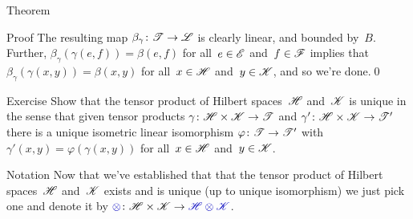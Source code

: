 \documentclass[a]{subfiles}
\begin{document}
\begin{parsec}
\begin{point}{Theorem}
\begin{point}{Proof}
The resulting map $\beta_\gamma\colon \mathscr{T}\to\mathscr{L}$
is clearly linear,
and
bounded by~$B$.
Further,
$\beta_\gamma(\gamma(e,f))=\beta(e,f)$
for all~$e\in\mathscr{E}$ and~$f\in\mathscr{F}$
implies
that $\beta_\gamma(\gamma(x,y))=\beta(x,y)$
for all~$x\in \mathscr{H}$ and~$y\in\mathscr{K}$,
and so we're done.\qed
\end{point}
\end{point}
\begin{point}{Exercise}%
Show that the tensor product of Hilbert spaces~$\mathscr{H}$
and~$\mathscr{K}$ is unique in the sense
that given tensor products $\gamma\colon \mathscr{H}\times\mathscr{K}\to\mathscr{T}$
and $\gamma'\colon\mathscr{H}\times\mathscr{K}\to\mathscr{T}'$
there is a unique isometric linear isomorphism
$\varphi\colon \mathscr{T}\to\mathscr{T}'$
with $\gamma'(x,y) = \varphi(\gamma(x,y))$
for all~$x\in\mathscr{H}$
and~$y\in\mathscr{K}$.
\end{point}
\begin{point}{Notation}%
Now that we've established
that that the tensor product
of Hilbert spaces~$\mathscr{H}$ and~$\mathscr{K}$
exists and is unique (up to unique isomorphism)
we just pick one and denote it by $\Define{\otimes}\colon
\scrH\times\scrK\to\Define{\scrH\otimes\scrK}$.
\end{point}
\end{parsec}
\end{document}
